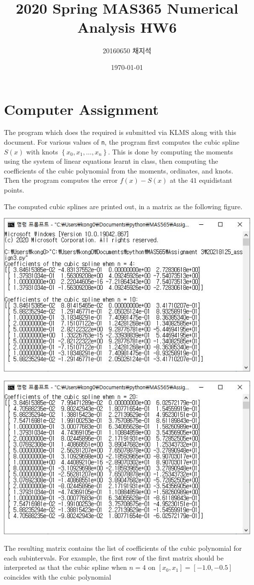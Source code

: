 \documentclass{article}
\title{2020 Spring MAS365 Numerical Analysis HW6}
\author{20160650 채지석}
\date{\today}
\newcommand{\set}[1]{\left\{ {#1} \right\}}
\begin{document}
\section*{Computer Assignment}
The program which does the required is submitted via KLMS along with this document. For various values of \texttt{n}, the program first computes the cubic spline $S(x)$ with knots $\set{x_0, x_1, \dots, x_n}$. This is done by computing the moments using the system of linear equations learnt in class, then computing the coefficients of the cubic polynomial from the moments, ordinates, and knots. Then the program computes the error $f(x) - S(x)$ at the $41$ equidistant points. \par 
The computed cubic splines are printed out, in a matrix as the following figure. 
\begin{center}
    \includegraphics[width=0.8\linewidth]{console.JPG}
\end{center}\begin{center}
  \includegraphics[width=0.8\linewidth]{console2.JPG}
\end{center}
The resulting matrix contains the list of coefficients of the cubic polynomial for each subintervals. For example, the first row of the first matrix should be interpreted as that the cubic spline when $n=4$ on $[x_0, x_1] = [-1.0, -0.5]$ coincides with the cubic polynomial
\end{document}

